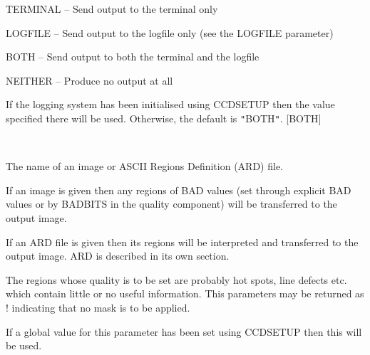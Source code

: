 \documentclass[twoside,11pt]{article}
\newcommand{\htmlref}[2]{#1}
\renewcommand{\_}{\texttt{\symbol{95}}}
\newcommand{\qt}[1]{{\tt "}#1{\tt "}}
\newcommand{\xroutine}[1]{\htmlref{{\sc #1}}{#1}}
\newcommand{\sstsubsection}[1]{ \item[{#1}] \mbox{} \\}
\newcommand{\sstitem}{\item}
\newcommand{\sstsubsection}[1]{\item[{#1}]}
\newcommand{\sstitem}{\item}
\begin{document}
{{{{            \sstitem
               TERMINAL  -- Send output to the terminal only

            \sstitem
               LOGFILE   -- Send output to the logfile only (see the
                               LOGFILE parameter)

            \sstitem
               BOTH      -- Send output to both the terminal and the
                               logfile

            \sstitem
               NEITHER   -- Produce no output at all

         }
         If the logging system has been initialised using \xroutine{CCDSETUP}
         then the value specified there will be used. Otherwise, the
         default is \qt{BOTH}.
         [BOTH]
      }
      \sstsubsection{
         MASK = LITERAL (Read)
      } {
         The name of an image or ASCII Regions Definition (ARD) file.

         If an image is given then any regions of BAD values (set through
         explicit BAD values or by BADBITS in the quality component)
         will be transferred to the output image.

         If an ARD file is given then its regions will be interpreted
         and transferred to the output image. ARD is described in its own
         section.

         The regions whose quality is to be set are probably hot spots,
         line defects etc.  which contain little or no useful
         information. This parameters may be returned as ! indicating
         that no mask is to be applied.

         If a global value for this parameter has been set using
         \xroutine{CCDSETUP} then this will be used.

}}}
\end{document}
